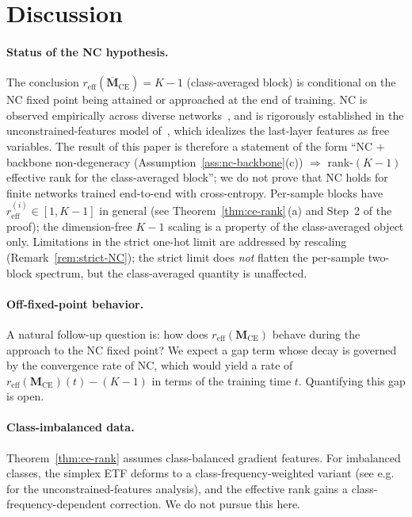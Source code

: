 \documentclass[12pt]{amsart}
\theoremstyle{definition}
\theoremstyle{remark}
\newcommand{\bM}{\mathbf{M}}
\begin{document}
\section{Discussion}\label{sec:disc}

\paragraph{Status of the NC hypothesis.}
The conclusion $r_{\mathrm{eff}}(\overline{\bM}_{\mathrm{CE}}) = K-1$
(class-averaged block) is conditional on the NC fixed point being
attained or approached at the end of training. NC is observed
empirically across diverse networks~\cite{papyan2020}, and is
rigorously established in the unconstrained-features model
of~\cite{lu2022,mixon2022}, which idealizes the last-layer features
as free variables. The result of this paper is therefore a
statement of the form ``NC $+$ backbone non-degeneracy
(Assumption~\ref{ass:nc-backbone}(c)) $\Rightarrow$ rank-$(K-1)$
effective rank for the class-averaged block''; we do not prove that
NC holds for finite networks trained end-to-end with cross-entropy.
Per-sample blocks have $r_{\mathrm{eff}}^{(i)} \in [1, K-1]$ in
general (see Theorem~\ref{thm:ce-rank}\,(a) and Step~2 of the
proof); the dimension-free $K-1$ scaling is a property of the
class-averaged object only.
Limitations in the strict one-hot limit are addressed by rescaling
(Remark~\ref{rem:strict-NC}); the strict limit does \emph{not}
flatten the per-sample two-block spectrum, but the class-averaged
quantity is unaffected.

\paragraph{Off-fixed-point behavior.}
A natural follow-up question is: how does
$r_{\mathrm{eff}}(\bM_{\mathrm{CE}})$ behave during the approach to
the NC fixed point? We expect a gap term whose decay is governed by
the convergence rate of NC, which would yield a rate of
$r_{\mathrm{eff}}(\bM_{\mathrm{CE}})(t) - (K-1)$ in terms of the
training time $t$. Quantifying this gap is open.

\paragraph{Class-imbalanced data.}
Theorem~\ref{thm:ce-rank} assumes class-balanced gradient features.
For imbalanced classes, the simplex ETF deforms to a
class-frequency-weighted variant (see e.g.~\cite{Fang2021} for the
unconstrained-features analysis), and the effective rank gains a
class-frequency-dependent correction. We do not pursue this here.
\end{document}
